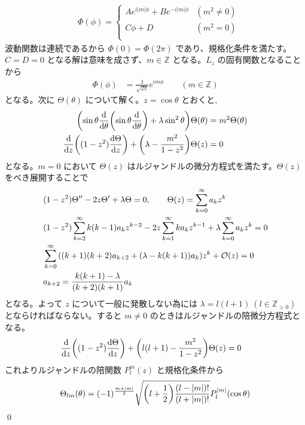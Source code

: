 \documentclass[uplatex,dvipdfmx,a4paper,11pt]{jlreq}
\makeatletter
\newcommand{\ZZ}{\mathbb{Z}}
\numberwithin{equation}{section}
\theoremstyle{definition}
\renewenvironment{proof}[1][\proofname]{\par
  \normalfont
  \topsep6\p@\@plus6\p@ \trivlist
  \item[\hskip\labelsep{\bfseries #1}\@addpunct{\bfseries}]\ignorespaces\quad\par
}{%
  \qed\endtrivlist\@endpefalse
}
\renewcommand\proofname{証明}
\makeatother
\begin{document}
\begin{proof}
\begin{align}
     & \Phi(\phi) = \begin{cases}
                      Ae^{i|m|\phi} + Be^{-i|m|\phi} & (m^2 \neq 0) \\
                      C\phi + D                      & (m^2 = 0)    \\
                    \end{cases}
  \end{align}
  波動関数は連続であるから $\Phi(0) = \Phi(2\pi)$ であり、規格化条件を満たす。$C = D = 0$ となる解は意味を成さず、$m\in\ZZ$ となる。$L_z$ の固有関数となることから
  \begin{align}
    \Phi(\phi) & = \frac{1}{\sqrt{2\pi}}e^{im\phi} \qquad (m\in\ZZ)
  \end{align}
  となる。次に $\Theta(\theta)$ について解く。$z = \cos\theta$ とおくと,
  \begin{align}
    \qty(\sin\theta\dv{\theta}\qty(\sin\theta\dv{\theta}) + \lambda \sin^2\theta)\Theta(\theta) & = m^2\Theta(\theta) \\
    \dv{z}\qty((1 - z^2)\dv{\Theta}{z}) + \qty(\lambda - \frac{m^2}{1 - z^2})\Theta(z)          & = 0
  \end{align}
  となる。$m = 0$ において $\Theta(z)$ はルジャンドルの微分方程式を満たす。$\Theta(z)$ をべき展開することで
  \begin{align}
     & (1 - z^2)\Theta'' - 2z\Theta' + \lambda\Theta = 0, \qquad \Theta(z) = \sum_{k = 0}^\infty a_kz^k                          \\
     & (1 - z^2)\sum_{k = 2}^\infty k(k-1)a_kz^{k-2} - 2z\sum_{k = 1}^\infty ka_kz^{k-1} + \lambda\sum_{k = 0}^\infty a_kz^k = 0 \\
     & \sum_{k = 0}^\infty \qty((k+1)(k+2)a_{k+2} + \qty(\lambda - k(k+1))a_k)z^k + \mathcal{O}(z) = 0                           \\
     & a_{k+2} = \frac{k(k+1) - \lambda}{(k+2)(k+1)}a_k
  \end{align}
  となる。よって $z$ について一般に発散しない為には $\lambda = l(l+1)\ (l\in\ZZ_{>0})$ とならければならない。すると $m\neq 0$ のときはルジャンドルの陪微分方程式となる。
  \begin{align}
    \dv{z}\qty((1 - z^2)\dv{\Theta}{z}) + \qty(l(l+1) - \frac{m^2}{1 - z^2})\Theta(z) & = 0
  \end{align}
  これよりルジャンドルの陪関数 $P_l^m(z)$ と規格化条件から
  \begin{align}
    \Theta_{lm}(\theta) & = (-1)^{\frac{m + |m|}{2}}\sqrt{\qty(l + \frac{1}{2})\frac{(l - |m|)!}{(l + |m|)!}}P_l^{|m|}(\cos\theta) \\

\end{align}
\end{proof}
\end{document}
